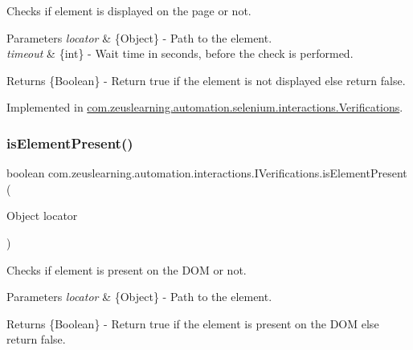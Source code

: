 Checks if element is displayed on the page or not.


\begin{DoxyParams}{Parameters}
{\em locator} & \{Object\} -\/ Path to the element. \\
\hline
{\em timeout} & \{int\} -\/ Wait time in seconds, before the check is performed. \\
\hline
\end{DoxyParams}
\begin{DoxyReturn}{Returns}
\{Boolean\} -\/ Return {\ttfamily true} if the element is not displayed else return false. 
\end{DoxyReturn}


Implemented in \hyperlink{classcom_1_1zeuslearning_1_1automation_1_1selenium_1_1interactions_1_1Verifications_a5b51bdfb17dbfd284572253189f54fb4}{com.\+zeuslearning.\+automation.\+selenium.\+interactions.\+Verifications}.

\hypertarget{interfacecom_1_1zeuslearning_1_1automation_1_1interactions_1_1IVerifications_abc5aef72ba806e5033b1c815799dfd80}{}\label{interfacecom_1_1zeuslearning_1_1automation_1_1interactions_1_1IVerifications_abc5aef72ba806e5033b1c815799dfd80} 
\subsubsection{\texorpdfstring{is\+Element\+Present()}{isElementPresent()}\hspace{0.1cm}{\footnotesize\ttfamily [1/2]}}
{\footnotesize\ttfamily boolean com.\+zeuslearning.\+automation.\+interactions.\+I\+Verifications.\+is\+Element\+Present (\begin{DoxyParamCaption}\item[{Object}]{locator }\end{DoxyParamCaption})}

Checks if element is present on the D\+OM or not.


\begin{DoxyParams}{Parameters}
{\em locator} & \{Object\} -\/ Path to the element. \\
\hline
\end{DoxyParams}
\begin{DoxyReturn}{Returns}
\{Boolean\} -\/ Return {\ttfamily true} if the element is present on the D\+OM else return false. 
\end{DoxyReturn}


